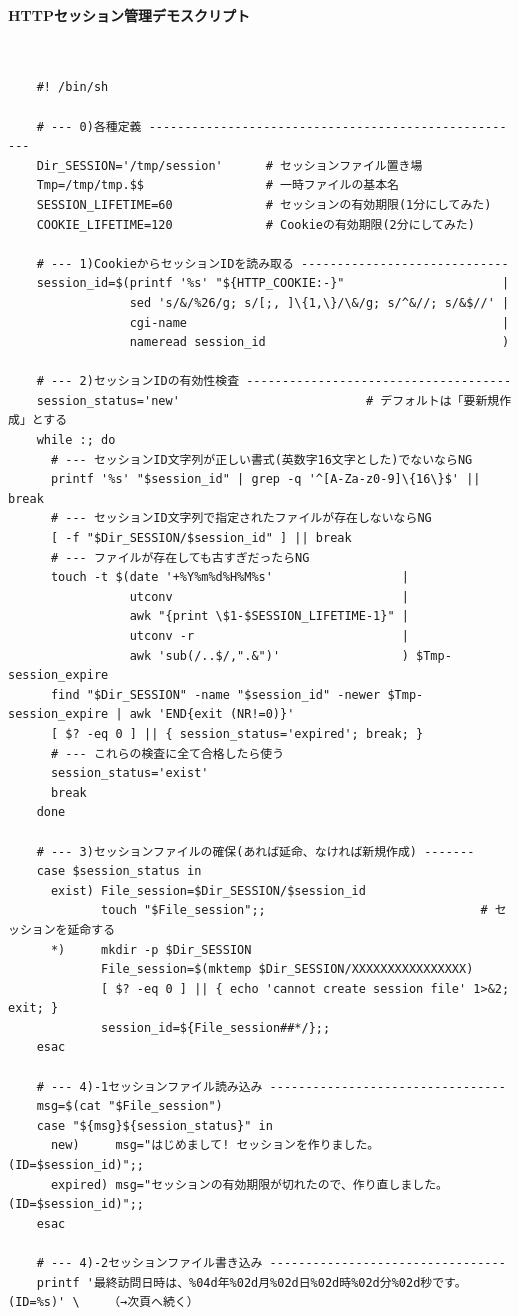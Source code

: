 \paragraph{HTTPセッション管理デモスクリプト} 　\\
\begin{frameboxit}{160.0mm}
\begin{verbatim}
	#! /bin/sh
	
	# --- 0)各種定義 -----------------------------------------------------
	Dir_SESSION='/tmp/session'      # セッションファイル置き場
	Tmp=/tmp/tmp.$$                 # 一時ファイルの基本名
	SESSION_LIFETIME=60             # セッションの有効期限(1分にしてみた)
	COOKIE_LIFETIME=120             # Cookieの有効期限(2分にしてみた)
	
	# --- 1)CookieからセッションIDを読み取る -----------------------------
	session_id=$(printf '%s' "${HTTP_COOKIE:-}"                      |
	             sed 's/&/%26/g; s/[;, ]\{1,\}/\&/g; s/^&//; s/&$//' |
	             cgi-name                                            |
	             nameread session_id                                 )
	
	# --- 2)セッションIDの有効性検査 -------------------------------------
	session_status='new'                          # デフォルトは「要新規作成」とする
	while :; do
	  # --- セッションID文字列が正しい書式(英数字16文字とした)でないならNG
	  printf '%s' "$session_id" | grep -q '^[A-Za-z0-9]\{16\}$' || break
	  # --- セッションID文字列で指定されたファイルが存在しないならNG
	  [ -f "$Dir_SESSION/$session_id" ] || break
	  # --- ファイルが存在しても古すぎだったらNG
	  touch -t $(date '+%Y%m%d%H%M%s'                  |
	             utconv                                |
	             awk "{print \$1-$SESSION_LIFETIME-1}" |
	             utconv -r                             |
	             awk 'sub(/..$/,".&")'                 ) $Tmp-session_expire
	  find "$Dir_SESSION" -name "$session_id" -newer $Tmp-session_expire | awk 'END{exit (NR!=0)}'
	  [ $? -eq 0 ] || { session_status='expired'; break; }
	  # --- これらの検査に全て合格したら使う
	  session_status='exist'
	  break
	done
	
	# --- 3)セッションファイルの確保(あれば延命、なければ新規作成) -------
	case $session_status in
	  exist) File_session=$Dir_SESSION/$session_id
	         touch "$File_session";;                              # セッションを延命する
	  *)     mkdir -p $Dir_SESSION
	         File_session=$(mktemp $Dir_SESSION/XXXXXXXXXXXXXXXX)
	         [ $? -eq 0 ] || { echo 'cannot create session file' 1>&2; exit; }
	         session_id=${File_session##*/};;
	esac
	
	# --- 4)-1セッションファイル読み込み ---------------------------------
	msg=$(cat "$File_session")
	case "${msg}${session_status}" in
	  new)     msg="はじめまして! セッションを作りました。(ID=$session_id)";;
	  expired) msg="セッションの有効期限が切れたので、作り直しました。(ID=$session_id)";;
	esac
	
	# --- 4)-2セッションファイル書き込み ---------------------------------
	printf '最終訪問日時は、%04d年%02d月%02d日%02d時%02d分%02d秒です。(ID=%s)' \    （→次頁へ続く）
\end{verbatim}
\end{frameboxit} \\
